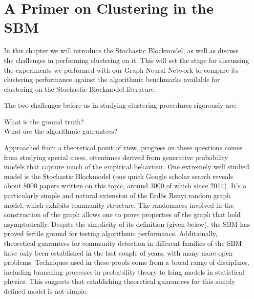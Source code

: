 \chapter{A Primer on Clustering in the SBM}

In this chapter we will introduce the Stochastic Blockmodel, as well as discuss the challenges in performing clustering on it. This will set the stage for discussing the experiments we performed with our Graph Neural Network to compare its clustering performance against the algorithmic benchmarks available for clustering on the Stochastic Blockmodel literature. 


The two challenges before us in studying clustering procedures rigorously are: 
\begin{center}
What is the ground truth?\\

What are the algorithmic guarantees?
\end{center}
Approached from a theoretical point of view, progress on these questions comes from studying special cases, oftentimes derived from generative probability models that capture much of the empirical behaviour.  One extremely well studied model is the Stochastic Blockmodel (one quick Google scholar search reveals about 8000 papers written on this topic, around 3000 of which since 2014).  It's a particularly simple and natural extension of the Erd\H{o}s Renyi random graph model, which exhibits community structure.  The randomness involved in the construction of the graph allows one to prove properties of the graph that hold asymptotically.  Despite the simplicity of its definition (given below), the SBM has proved fertile ground for testing algorithmic performance.  Additionally, theoretical guarantees for community detection in different families of the SBM have only been established in the last couple of years, with many more open problems.  Techniques used in these proofs come from a broad range of disciplines, including  branching processes in probability theory to Ising models in statistical physics.  This suggests that establishing theoretical guarantees for this simply defined model is not simple. \newpage

